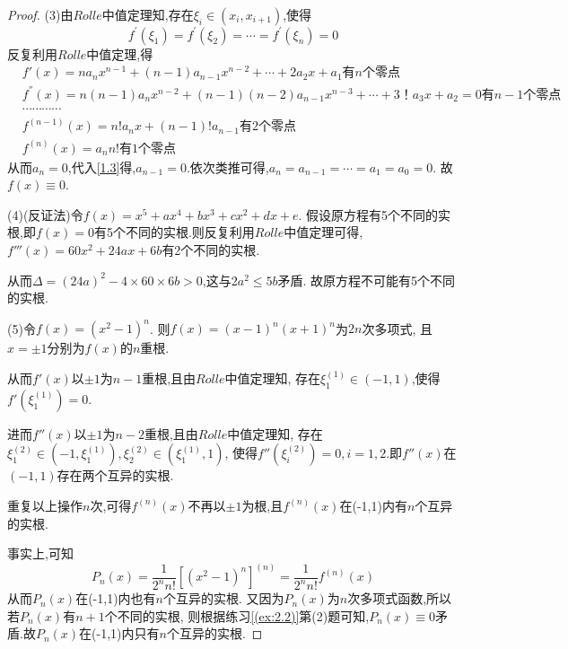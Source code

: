 \documentclass[lang=cn,newtx,10pt,scheme=chinese]{../Template/elegantbook}
\begin{document}
\begin{exercise}
\begin{proof}
    (3)由$Rolle$中值定理知,存在$\xi_i\in(x_i,x_{i+1})$,使得
    \begin{equation}
        f^{\prime}\left( \xi _1 \right) =f^{\prime}\left( \xi _2 \right) =\cdots =f^{\prime}\left( \xi _n \right) =0
        \nonumber
    \end{equation}
    反复利用$Rolle$中值定理,得
    \begin{align}
            &f'\left( x \right) =na_nx^{n-1}+\left( n-1 \right) a_{n-1}x^{n-2}+\cdots +2a_2x+a_1\text{有}n\text{个零点}
            \\
            &f^{''}(x)=n\left( n-1 \right) a_nx^{n-2}+\left( n-1 \right) \left( n-2 \right) a_{n-1}x^{n-3}+\cdots +3\text{！}a_3x+a_2=0\text{有}n-1\text{个零点}
            \\
            &\cdots \cdots \cdots \cdots \nonumber
            \\
            &f^{(n-1)}(x)=n!a_nx+\left( n-1 \right) !a_{n-1}\text{有}2\text{个零点} \label{1.3}
            \\
            &f^{(n)}(x)=a_nn!\text{有}1\text{个零点}
    \end{align}
    从而$a_n=0$,代入\eqref{1.3}得,$a_{n-1}=0$.依次类推可得,$a_n=a_{n-1}=\cdots=a_1=a_0=0$.
    故$f(x)\equiv 0$.

    (4)(反证法)令$f(x)=x^5+ax^4+bx^3+cx^2+dx+e$.
    假设原方程有5个不同的实根,即$f(x)=0$有5个不同的实根.则反复利用$Rolle$中值定理可得,
    $f'''(x)=60x^2+24ax+6b$有2个不同的实根.
    
    从而$\Delta=(24a)^2-4\times 60\times 6b>0$,这与$2a^2\le 5b$矛盾.
    故原方程不可能有5个不同的实根.

    (5)令$f(x)=\left( x^2-1 \right) ^n$.
    则$f(x)=\left( x-1 \right) ^n\left( x+1 \right) ^n$为$2n$次多项式,
    且$x=\pm1$分别为$f(x)$的$n$重根.

    从而$f'(x)$以$\pm1$为$n-1$重根,且由$Rolle$中值定理知,
    存在$\xi _{1}^{(1)}\in(-1,1)$,使得$f'(\xi _{1}^{(1)})=0$.

    进而$f''(x)$以$\pm1$为$n-2$重根,且由$Rolle$中值定理知,
    存在$\xi _{1}^{(2)}\in(-1,\xi _{1}^{(1)}),\xi _{2}^{(2)}\in(\xi _{1}^{(1)},1)$,
    使得$f''(\xi _{i}^{(2)})=0,i=1,2$.即$f''(x)$在$(-1,1)$存在两个互异的实根.

    重复以上操作$n$次,可得$f^{(n)}(x)$不再以$\pm1$为根,且$f^{(n)}(x)$在(-1,1)内有$n$个互异的实根.

    事实上,可知
    \begin{equation}
        P_n\left( x \right) =\frac{1}{2^nn!}\left[ \left( x^2-1 \right) ^n \right] ^{\left( n \right)}
        =\frac{1}{2^nn!}f^{(n)}(x)
        \nonumber
    \end{equation}
    从而$P_n(x)$在(-1,1)内也有$n$个互异的实根.
    又因为$P_n(x)$为$n$次多项式函数,所以若$P_n(x)$有$n+1$个不同的实根,
    则根据练习\eqref{(ex:2.2)}第(2)题可知,$P_n(x)\equiv 0$矛盾.故$P_n(x)$在(-1,1)内只有$n$个互异的实根.


\end{proof}
\end{exercise}
\end{document}
